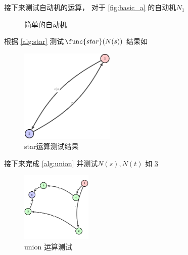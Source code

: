 \documentclass[../report]{subfiles}
\begin{document}
接下来测试自动机的运算，
对于%
\cref{fig:basic_a}%
的自动机$N_1$
\begin{figure}[H]
  \qquad
  \caption{简单的自动机}
  \label{fig:basic}
\end{figure}

根据%
\cref{alg:star}
测试$\func{star}(N(s))$
结果如%
\begin{figure}[H]
  \centering
  \includegraphics[width = 0.4\textwidth]{test_star}
  \caption{star运算测试结果}
  \label{fig:test_star}
\end{figure}

接下来完成%
\cref{alg:union}
并测试$N(s),N(t)$
如%
\cref{fig:test_union}

\begin{figure}[H]
  \centering
  \includegraphics[width = 0.3\textwidth]{test_union}
  \caption{union 运算测试}
  \label{fig:test_union}
\end{figure}
\end{document}
